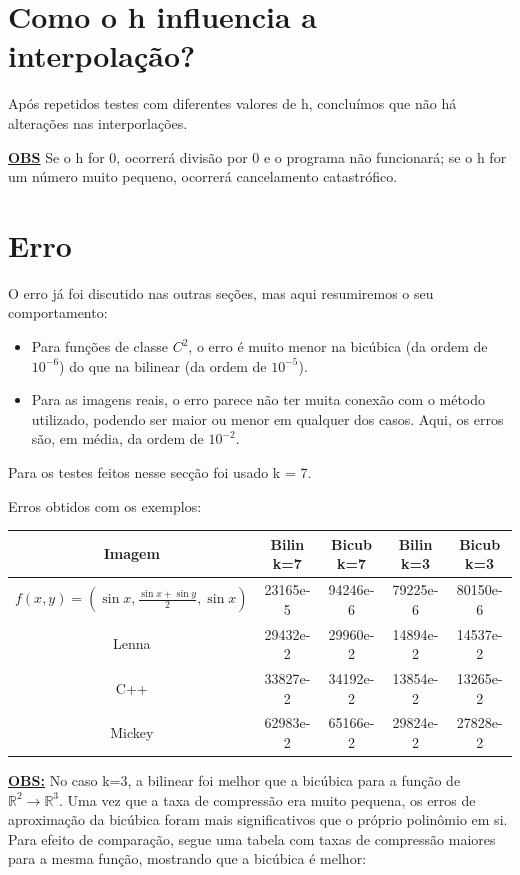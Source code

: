 \documentclass[12pt]{article}
\newcommand{\real}{\mathbb{R}}
\newcommand{\mytitle}[1]{\textbf{\underline{#1}}}
\begin{document}
\newpage
\section{Como o h influencia a interpolação?}
Após repetidos testes com diferentes valores de h, concluímos que não há alterações nas interporlações.

\mytitle{OBS} Se o h for 0, ocorrerá divisão por 0 e o programa não funcionará; se o h for um número muito pequeno, ocorrerá cancelamento catastrófico.

\section{Erro}
O erro já foi discutido nas outras seções, mas aqui resumiremos o seu comportamento:

\begin{itemize}
  
\item Para funções de classe $C^2$, o erro é muito menor na bicúbica (da ordem de $10^{-6}$) do que na bilinear (da ordem de $10^{-5}$).
  
\item Para as imagens reais, o erro parece não ter muita conexão com o método utilizado, podendo ser maior ou menor em qualquer dos casos. Aqui, os erros são, em média, da ordem de $10^{-2}$.
  
\end{itemize}

Para os testes feitos nesse secção foi usado k = 7.

Erros obtidos com os exemplos:
\begin{center}
  \begin{tabular}{||c | c | c | c | c||} 
    \hline
    Imagem & Bilin k=7 & Bicub k=7 & Bilin k=3 & Bicub k=3 \\ [0.5ex] 
    \hline\hline
    $f(x, y) = (\sin{x}, \frac{\sin{x}+\sin{y}}{2}, \sin{x})$ & 23165e-5 & 94246e-6 & 79225e-6 & 80150e-6 \\ 
    \hline
    Lenna & 29432e-2 & 29960e-2 & 14894e-2 & 14537e-2 \\
    \hline
    C++ & 33827e-2 & 34192e-2 & 13854e-2 & 13265e-2 \\
    \hline
    Mickey & 62983e-2 & 65166e-2 & 29824e-2 & 27828e-2 \\ [1ex]
    \hline
  \end{tabular}
\end{center}

\mytitle{OBS:} No caso k=3, a bilinear foi melhor que a bicúbica para a função de $\real^2\to \real^3$. Uma vez que a taxa de compressão era muito pequena, os erros de aproximação da bicúbica foram mais significativos que o próprio polinômio em si. Para efeito de comparação, segue uma tabela com taxas de compressão maiores para a mesma função, mostrando que a bicúbica é melhor:
\end{document}
